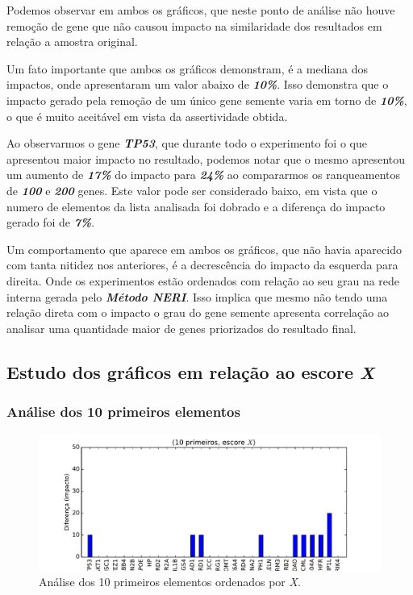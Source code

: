 %
Podemos observar em ambos os gráficos, que neste ponto de análise não houve remoção de gene que não causou impacto na similaridade dos resultados em relação a amostra original.

%
Um fato importante que ambos os gráficos demonstram, é a mediana dos impactos, onde apresentaram um valor abaixo de \textbf{\textit{10\%}}. Isso demonstra que o impacto gerado pela remoção de um único gene semente varia em torno de \textbf{\textit{10\%}}, o que é muito aceitável em vista da assertividade obtida.

%
Ao observarmos o gene \textbf{\textit{TP53}}, que durante todo o experimento foi o que apresentou maior impacto no resultado, podemos notar que o mesmo apresentou um aumento de \textbf{\textit{17\%}} do impacto para \textbf{\textit{24\%}} ao compararmos os ranqueamentos de \textbf{\textit{100}} e \textbf{\textit{200}} genes. Este valor pode ser considerado baixo, em vista que o numero de elementos da lista analisada foi dobrado e a diferença do impacto gerado foi de \textbf{\textit{7\%}}.

% 
Um comportamento que aparece em ambos os gráficos, que não havia aparecido com tanta nitidez nos anteriores, é a decrescência do impacto da esquerda para direita. Onde os experimentos estão ordenados com relação ao seu grau na rede interna gerada pelo \textsl{\textbf{Método NERI}}. Isso implica que mesmo não tendo uma relação direta com o impacto o grau do gene semente apresenta correlação ao analisar uma quantidade maior de genes priorizados do resultado final.

%
%
%
%
\subsection{Estudo dos gráficos em relação ao escore \textit{X}}
%
\subsubsection{Análise dos 10 primeiros elementos}
%
\begin{figure}[ht!]
\centering
\includegraphics[width=\textwidth]{Images/analyses/fig_LOO_X_10.pdf}
\caption {Análise dos 10 primeiros elementos ordenados por \textit{X}.
\label{fig_LOO_X_10}}
\end{figure}
%

